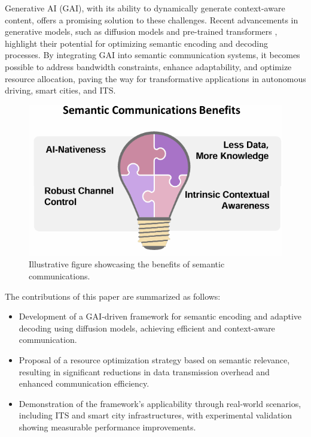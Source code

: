 \documentclass[journal]{IEEEtran}
\begin{document}
Generative AI (GAI), with its ability to dynamically generate context-aware content, offers a promising solution to these challenges. Recent advancements in generative models, such as diffusion models and pre-trained transformers \cite{Radford2018ImprovingLU}, highlight their potential for optimizing semantic encoding and decoding processes. By integrating GAI into semantic communication systems, it becomes possible to address bandwidth constraints, enhance adaptability, and optimize resource allocation, paving the way for transformative applications in autonomous driving, smart cities, and ITS.

\begin{figure}[htbp]
    \centering
    \includegraphics[width=\linewidth]{1.png}
    \caption{Illustrative figure showcasing the benefits of semantic communications.\cite{chaccour2022dataknowledgebuildinggeneration}}
    \label{fig:semantic_benefits}
\end{figure}

The contributions of this paper are summarized as follows:
\begin{itemize}
    \item Development of a GAI-driven framework for semantic encoding and adaptive decoding using diffusion models, achieving efficient and context-aware communication.
    \item Proposal of a resource optimization strategy based on semantic relevance, resulting in significant reductions in data transmission overhead and enhanced communication efficiency.
    \item Demonstration of the framework’s applicability through real-world scenarios, including ITS and smart city infrastructures, with experimental validation showing measurable performance improvements.
\end{itemize}
\end{document}
